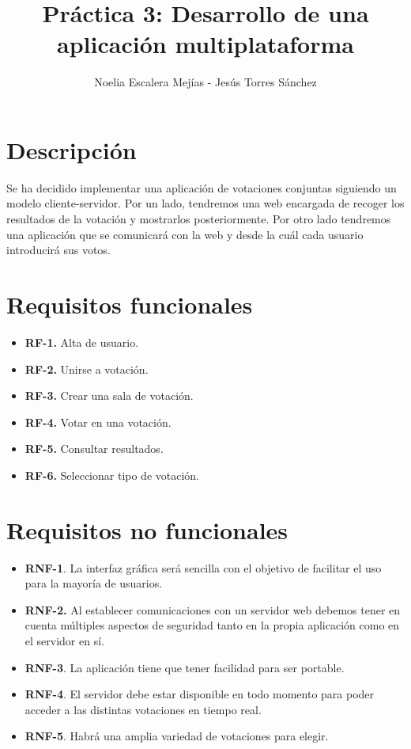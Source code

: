 \documentclass{article}
\begin{document}
\title{
	\textbf{Práctica 3: Desarrollo de una aplicación multiplataforma}
}
\author{Noelia Escalera Mejías - Jesús Torres Sánchez}
\maketitle

\section{Descripción}
Se ha decidido implementar una aplicación de votaciones conjuntas siguiendo un modelo cliente-servidor. Por un lado, tendremos una web encargada de recoger los resultados de la votación y mostrarlos posteriormente. Por otro lado tendremos una aplicación que se comunicará con la web y desde la cuál cada usuario introducirá sus votos.

\section{Requisitos funcionales}
\begin{itemize}
	\item \textbf{RF-1.} Alta de usuario.
	\item \textbf{RF-2.} Unirse a votación.
	\item \textbf{RF-3.} Crear una sala de votación.
	\item \textbf{RF-4.} Votar en una votación.
	\item \textbf{RF-5.} Consultar resultados.
	\item \textbf{RF-6.} Seleccionar tipo de votación. \\
\end{itemize}

\section{Requisitos no funcionales}
\begin{itemize}
	\item \textbf{RNF-1}. La interfaz gráfica será sencilla con el objetivo de facilitar el uso para la mayoría de usuarios.
	\item \textbf{RNF-2.} Al establecer comunicaciones con un servidor web debemos tener
	en cuenta múltiples aspectos de seguridad tanto en la propia aplicación
	como en el servidor en sí.
	\item \textbf{RNF-3}. La aplicación tiene que tener facilidad para ser portable.
	\item \textbf{RNF-4}. El servidor debe estar disponible en todo momento para poder
	acceder a las distintas votaciones en tiempo real.
	\item \textbf{RNF-5}. Habrá una amplia variedad de votaciones para elegir.
\end{itemize}
\end{document}

